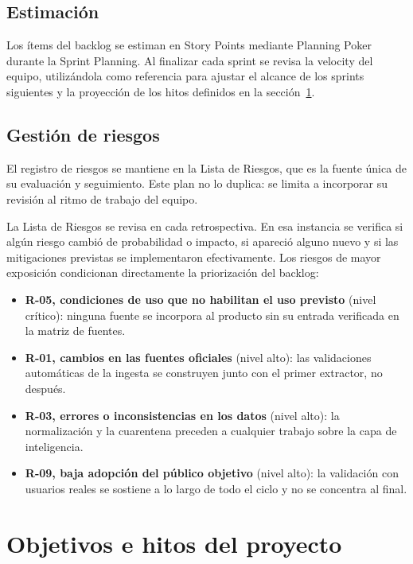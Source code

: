 \documentclass[11pt,a4paper]{article}
\begin{document}
\subsection{Estimaci\'on}

Los \'items del backlog se estiman en Story Points mediante Planning Poker durante la Sprint Planning. Al finalizar cada sprint se revisa la velocity del equipo, utiliz\'andola como referencia para ajustar el alcance de los sprints siguientes y la proyecci\'on de los hitos definidos en la secci\'on~\ref{sec:hitos}.

\subsection{Gesti\'on de riesgos}

El registro de riesgos se mantiene en la Lista de Riesgos, que es la fuente \'unica de su evaluaci\'on y seguimiento. Este plan no lo duplica: se limita a incorporar su revisi\'on al ritmo de trabajo del equipo.

La Lista de Riesgos se revisa en cada retrospectiva. En esa instancia se verifica si alg\'un riesgo cambi\'o de probabilidad o impacto, si apareci\'o alguno nuevo y si las mitigaciones previstas se implementaron efectivamente. Los riesgos de mayor exposici\'on condicionan directamente la priorizaci\'on del backlog:

\begin{itemize}
  \item \textbf{R-05, condiciones de uso que no habilitan el uso previsto} (nivel cr\'itico): ninguna fuente se incorpora al producto sin su entrada verificada en la matriz de fuentes.
  \item \textbf{R-01, cambios en las fuentes oficiales} (nivel alto): las validaciones autom\'aticas de la ingesta se construyen junto con el primer extractor, no despu\'es.
  \item \textbf{R-03, errores o inconsistencias en los datos} (nivel alto): la normalizaci\'on y la cuarentena preceden a cualquier trabajo sobre la capa de inteligencia.
  \item \textbf{R-09, baja adopci\'on del p\'ublico objetivo} (nivel alto): la validaci\'on con usuarios reales se sostiene a lo largo de todo el ciclo y no se concentra al final.
\end{itemize}

\section{Objetivos e hitos del proyecto}
\label{sec:hitos}
\end{document}
